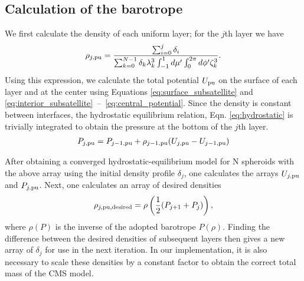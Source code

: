 \subsection{Calculation of the barotrope} \label{barotrope}

We first calculate the density of each uniform layer; for the $j$th layer we have 
%
\begin{equation}
\begin{aligned}
    \rho_{j,{\rm pu}} = \frac{\sum_{i=0}^j\delta_i}{\sum_{k=0}^{N-1}
        \delta_k \lambda_k^3 \int_{-1}^1 d\mu' \int_{0}^{2\pi} d\phi' \zeta_k^3}.
\end{aligned}
\label{eq:barotrope}
\end{equation}
%
Using this expression, we calculate the total potential $U_{\rm pu}$ on the surface
of each layer and at the center using Equations \eqref{eq:surface_subsatellite} and
\eqref{eq:interior_subsatellite}~--~\eqref{eq:central_potential}. Since the density
is constant between interfaces, the hydrostatic equilibrium relation,
Eqn. \eqref{eq:hydrostatic} is trivially integrated to obtain the pressure at the
bottom of the $j$th layer.
%
\begin{equation}
\begin{aligned}
    P_{j,{\rm pu}} = P_{j-1,{\rm pu}} + \rho_{j-1,{\rm pu}}
    (U_{j,{\rm pu}}-U_{j-1,{\rm pu}})
\end{aligned}
\end{equation}

After obtaining a converged hydrostatic-equilibrium model for N spheroids with the
above array using the initial density profile $\delta_j$, one calculates the arrays
$U_{j,{\rm pu}}$ and $P_{j,{\rm pu}}$. Next, one calculates an array of desired
densities 
%
\begin{equation}
\begin{aligned}
    \rho_{j,{\rm pu},{\rm desired}} = \rho\left(\frac{1}{2}(P_{j+1}+P_j)\right),
\end{aligned}
\label{eq:rhodesired}
\end{equation}
%
where $\rho(P)$ is the inverse of the adopted barotrope $P(\rho)$.  Finding the
difference between the desired densities of subsequent layers then gives a new array
of $\delta_j$ for use in the next iteration. In our implementation, it is also
necessary to scale these densities by a constant factor to obtain the correct total
mass of the CMS model. 

